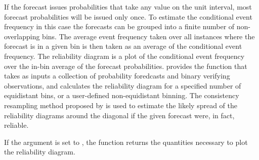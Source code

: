 \documentclass[article]{jss}
\begin{document}
If the forecast issues probabilities that take any value on the unit interval, most forecast probabilities will be issued only once.
To estimate the conditional event frequency in this case the forecasts can be grouped into a finite number of non-overlapping bins.
The average event frequency taken over all instances where the forecast is in a given bin is then taken as an average of the conditional event frequency.
The reliability diagram is a plot of the conditional event frequency over the in-bin average of the forecast probabilities.
 provides the function  that takes as inputs a collection of probability foredcasts and binary verifying observations, and calculates the reliability diagram for a specified number of equidistant bins, or a user-defined non-equidistant binning.
The consistency resampling method proposed by \citet{broecker2007increasing} is used to estimate the likely spread of the reliability diagrams around the diagonal if the given forecast were, in fact, reliable.


If the  argument is set to , the  function returns the quantities necessary to plot the reliability diagram.
\end{document}
